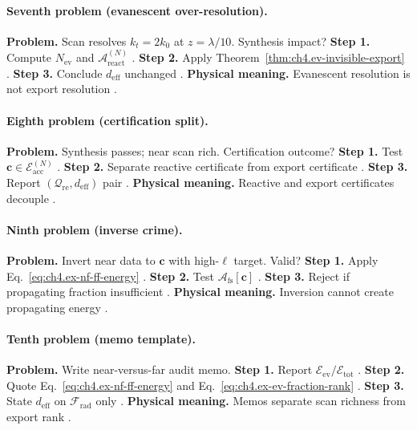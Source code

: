 \paragraph{Seventh problem (evanescent over-resolution).}
\textbf{Problem.} Scan resolves \(k_{t}=2k_{0}\) at \(z=\lambda/10\). Synthesis impact?
\textbf{Step 1.} Compute \(N_{\mathrm{ev}}\) and \(\mathcal{A}_{\mathrm{react}}^{(N)}\) \cite{jackson1999,hansen1988,harrington2001}.
\textbf{Step 2.} Apply Theorem~\ref{thm:ch4.ev-invisible-export} \cite{stratton1941,devaney2004}.
\textbf{Step 3.} Conclude \(d_{\mathrm{eff}}\) unchanged \cite{harrington2001,jackson1999}.
\textbf{Physical meaning.} Evanescent resolution is not export resolution \cite{hansen1988,stratton1941}.

\paragraph{Eighth problem (certification split).}
\textbf{Problem.} Synthesis passes; near scan rich. Certification outcome?
\textbf{Step 1.} Test \(\mathbf{c}\in\mathcal{E}_{\mathrm{acc}}^{(N)}\) \cite{harrington2001,stratton1941}.
\textbf{Step 2.} Separate reactive certificate from export certificate \cite{devaney2004,hansen1988}.
\textbf{Step 3.} Report \((\mathcal{Q}_{\mathrm{re}},d_{\mathrm{eff}})\) pair \cite{jackson1999,harrington2001}.
\textbf{Physical meaning.} Reactive and export certificates decouple \cite{stratton1941,devaney2004}.

\paragraph{Ninth problem (inverse crime).}
\textbf{Problem.} Invert near data to \(\mathbf{c}\) with high-\(\ell\) target. Valid?
\textbf{Step 1.} Apply Eq.~\eqref{eq:ch4.ex-nf-ff-energy} \cite{stratton1941,jackson1999,harrington2001}.
\textbf{Step 2.} Test \(\mathcal{A}_{\mathrm{fs}}[\mathbf{c}]\) \cite{hansen1988,devaney2004}.
\textbf{Step 3.} Reject if propagating fraction insufficient \cite{harrington2001,stratton1941}.
\textbf{Physical meaning.} Inversion cannot create propagating energy \cite{devaney2004,jackson1999}.

\paragraph{Tenth problem (memo template).}
\textbf{Problem.} Write near-versus-far audit memo.
\textbf{Step 1.} Report \(\mathcal{E}_{\mathrm{ev}}/\mathcal{E}_{\mathrm{tot}}\) \cite{stratton1941,jackson1999,harrington2001}.
\textbf{Step 2.} Quote Eq.~\eqref{eq:ch4.ex-nf-ff-energy} and Eq.~\eqref{eq:ch4.ex-ev-fraction-rank} \cite{devaney2004,hansen1988}.
\textbf{Step 3.} State \(d_{\mathrm{eff}}\) on \(\mathcal{F}_{\mathrm{rad}}\) only \cite{harrington2001,stratton1941}.
\textbf{Physical meaning.} Memos separate scan richness from export rank \cite{jackson1999,devaney2004}.

